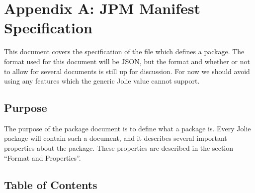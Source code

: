 \section{Appendix A: JPM Manifest Specification}\label{package-specification}

This document covers the specification of the file which defines a
package. The format used for this document will be JSON, but the format
and whether or not to allow for several documents is still up for
discussion. For now we should avoid using any features which the generic
Jolie value cannot support.

\subsection{Purpose}\label{purpose}

The purpose of the package document is to define what a package is.
Every Jolie package will contain such a document, and it describes
several important properties about the package. These properties are
described in the section ``Format and Properties''.

\subsection{Table of Contents}\label{table-of-contents}

